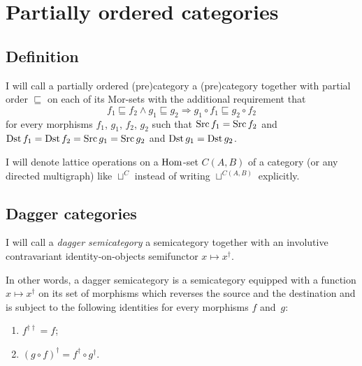 \section{Partially ordered categories}


\subsection{Definition}
\begin{defn}
I
will call a partially ordered (pre)category a (pre)category together
with partial order $\sqsubseteq$ on each of its Mor-sets with the
additional requirement that
\[
f_{1}\sqsubseteq f_{2}\land g_{1}\sqsubseteq g_{2}\Rightarrow g_{1}\circ f_{1}\sqsubseteq g_{2}\circ f_{2}
\]
for every morphisms $f_{1}$, $g_{1}$, $f_{2}$, $g_{2}$ such that
$\operatorname{Src} f_{1}=\operatorname{Src} f_{2}$ and $\operatorname{Dst} f_{1}=\operatorname{Dst} f_{2}=\operatorname{Src} g_{1}=\operatorname{Src} g_{2}$
and $\operatorname{Dst} g_{1}=\operatorname{Dst} g_{2}$.
\end{defn}
I will denote lattice operations on a $\operatorname{Hom}$-set $C(A,B)$ of a category
(or any directed multigraph) like $\sqcup^{C}$ instead of writing
$\sqcup^{C(A,B)}$ explicitly.


\subsection{Dagger categories}\label{sec-ordered-dagger}
\begin{defn}
I will call a \emph{dagger semicategory}
a semicategory together with an involutive contravariant identity-on-objects
semifunctor $x\mapsto x^{\dagger}$.

In other words, a dagger semicategory is a semicategory equipped with
a function $x\mapsto x^{\dagger}$ on its set of morphisms which reverses
the source and the destination and is subject to the following identities
for every morphisms $f$ and~$g$:
\begin{enumerate}
\item $f^{\dagger\dagger}=f$;
\item $(g\circ f)^{\dagger}=f^{\dagger}\circ g^{\dagger}$.
\end{enumerate}
\end{defn}

